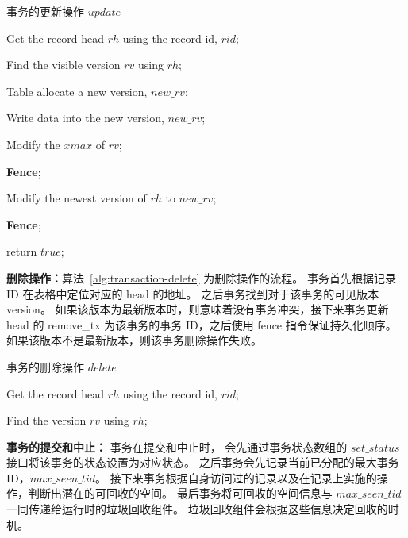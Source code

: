 \begin{algorithm}[h]
    \caption{事务的更新操作 $update$}
    \label{alg:transaction-update}
    \BlankLine
    Get the record head $rh$ using the record id, $rid$;

    Find the visible version $rv$ using $rh$;


    Table allocate a new version, $new\_rv$;

    Write data into the new version, $new\_rv$;

    Modify the $xmax$ of $rv$;

    \textbf{Fence};

    Modify the newest version of $rh$ to $new\_rv$;

    \textbf{Fence};

    return $true$;

\end{algorithm}


\textbf{删除操作：}算法~\ref{alg:transaction-delete} 为删除操作的流程。
事务首先根据记录 ID 在表格中定位对应的 head 的地址。
之后事务找到对于该事务的可见版本 version。
如果该版本为最新版本时，则意味着没有事务冲突，接下来事务更新 head 的 remove\_tx 为该事务的事务 ID，之后使用 fence 指令保证持久化顺序。
如果该版本不是最新版本，则该事务删除操作失败。

\begin{algorithm}[h]
    \caption{事务的删除操作 $delete$}
    \label{alg:transaction-delete}
    \BlankLine
    Get the record head $rh$ using the record id, $rid$;

    Find the version $rv$ using $rh$;


\end{algorithm}

\textbf{事务的提交和中止：} 事务在提交和中止时，
会先通过事务状态数组的 $set\_status$ 接口将该事务的状态设置为对应状态。
之后事务会先记录当前已分配的最大事务 ID，$max\_seen\_tid$。
接下来事务根据自身访问过的记录以及在记录上实施的操作，判断出潜在的可回收的空间。
最后事务将可回收的空间信息与 $max\_seen\_tid$ 一同传递给运行时的垃圾回收组件。
垃圾回收组件会根据这些信息决定回收的时机。


